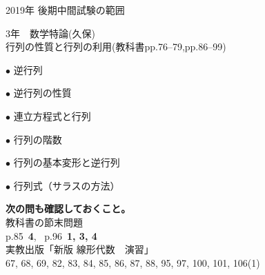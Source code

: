 \documentclass[a4paper,landscape,10pt,onecolumn,oneside,notitlepage,final]{jsarticle} %
\begin{document}

\begin{multicols}{2}

\vspace*{15mm}
\Large
2019年 後期中間試験の範囲\par
3年　数学特論(久保)\\

\large
行列の性質と行列の利用(教科書pp.76--79,pp.86--99)\par

$\bullet$ 逆行列\par
$\bullet$ 逆行列の性質\par
$\bullet$ 連立方程式と行列\par
$\bullet$ 行列の階数\par
$\bullet$ 行列の基本変形と逆行列\par
$\bullet$ 行列式（サラスの方法）\par

\vspace{10mm}
{\bf 次の問も確認しておくこと。}\\

教科書の節末問題\\
p.85\ {\bf 4}, \ p.96\ {\bf 1, 3, 4}\\

実教出版「新版 線形代数　演習」\\
67, 68, 69, 82, 83, 84, 85, 86, 87, 88, 95, 97, 100, 101, 106(1)

\normalsize
\newpage

\renewcommand{\ctoi}{Ckeep} %
\renewcommand{\ckai}{Comit} %
\small\printdoc

\newpage

\renewcommand{\ckai}{Cmagenta} %
\renewcommand{\ctoi}{Comit} %
\printdoc

\newpage

\end{multicols}
\end{document}
